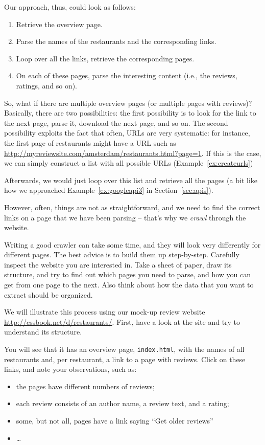 Our approach, thus, could look as follows:

\begin{enumerate}
	\item Retrieve the overview page.
	\item Parse the names of the restaurants and the corresponding links.
	\item Loop over all the links, retrieve the corresponding pages.
	\item On each of these pages, parse the interesting content (i.e., the reviews, ratings, and so on).
\end{enumerate}

So, what if there are multiple overview pages (or multiple pages with
reviews)? Basically, there are two possibilities: the first
possibility is to look for the link to the next page, parse it,
download the next page, and so on.  The second possibility exploits
the fact that often, URLs are very systematic: for instance, the first
page of restaurants might have a URL such as
\url{http://myreviewsite.com/amsterdam/restaurants.html?page=1}.  If this
is the case, we can simply construct a list with all possible URLs
(Example~\ref{ex:createurls})


Afterwards, we would just loop over this list and retrieve all the
pages (a bit like how we approached Example~\ref{ex:googleapi3} in Section~\ref{sec:apis}).

However, often, things are not as straightforward, and we need to find
the correct links on a page that we have been parsing -- that's why we
\emph{crawl} through the website.

Writing a good crawler can take some time, and they will look very
differently for different pages. The best advice is to build them up
step-by-step. Carefully inspect the website you are interested in.
Take a sheet of paper, draw its structure, and try to find out which
pages you need to parse, and how you can get from one page to the next.
Also think about how the data that you want to extract should be organized.

We will illustrate this process using our mock-up review website \url{http://cssbook.net/d/restaurants/}.
First, have a look at the site and try to understand its structure.

You will see that it has an overview page, \verb|index.html|, with the
names of all restaurants and, per restaurant, a link to a page with reviews.
Click on these links, and note your observations, such as:
\begin{itemize}
\item the pages have different numbers of reviews;
\item each review consists of an author name, a review text, and a rating;
\item some, but not all, pages have a link saying ``Get older reviews''
\item \ldots
\end{itemize}

